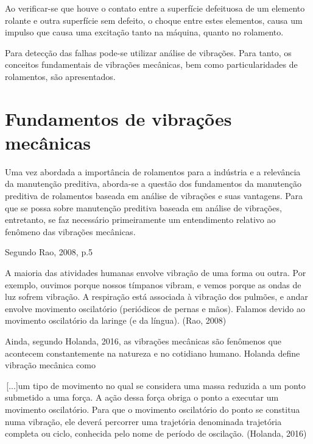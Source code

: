 \documentclass[
	12pt,				
	oneside,			
	a4paper,			
	english,			
	brazil				
	]{abntex2ppgsi}
\begin{document}
Ao verificar-se que houve o contato entre a superfície defeituosa de um elemento rolante e outra superfície sem defeito, o choque entre estes elementos, causa um impulso que causa uma excitação tanto na máquina, quanto no rolamento. 

Para detecção das falhas pode-se utilizar análise de vibrações. Para tanto, os conceitos fundamentais de vibrações mecânicas, bem como particularidades de rolamentos, são apresentados.

\section{\textbf{Fundamentos de vibrações mecânicas}}

Uma vez abordada a importância de rolamentos para a indústria e a relevância da manutenção preditiva, aborda-se a questão dos fundamentos da manutenção preditiva de rolamentos baseada em análise de vibrações e suas vantagens. Para que se possa sobre manutenção preditiva baseada em análise de vibrações, entretanto, se faz necessário primeiramente um entendimento relativo ao fenômeno das vibrações mecânicas. 

Segundo Rao, 2008, p.5

\begin{citacao}
A maioria das atividades humanas envolve vibração de uma forma ou outra. Por exemplo, ouvimos porque nossos tímpanos vibram, e vemos porque as ondas de luz sofrem vibração. A respiração está associada à vibração dos pulmões, e andar envolve movimento oscilatório (periódicos de pernas e mãos). Falamos devido ao movimento oscilatório da laringe (e da língua). (Rao, 2008)
\end{citacao}

Ainda, segundo Holanda, 2016, as vibrações mecânicas são fenômenos que acontecem constantemente na natureza e no cotidiano humano. Holanda define vibração mecânica como

\begin{citacao}
\,[...]um tipo de movimento no qual se considera uma massa reduzida a um ponto submetido a uma força. A ação dessa força obriga o ponto a executar um movimento oscilatório. Para que o movimento oscilatório do ponto se constitua numa vibração, ele deverá percorrer uma trajetória denominada trajetória completa ou ciclo, conhecida pelo nome de período de oscilação. (Holanda, 2016)
\end{citacao}
\end{document}
